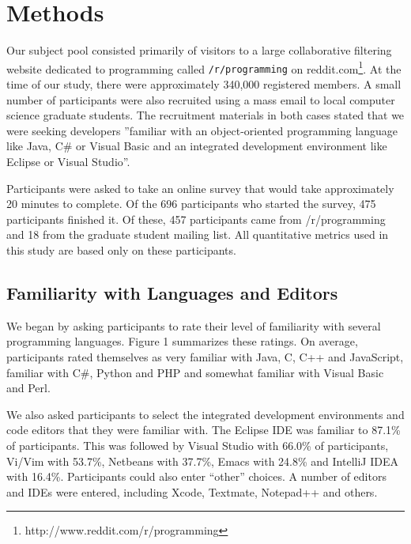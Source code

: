 \documentclass[conference]{IEEEtran}
\begin{document}

\section{Methods}
Our subject pool consisted primarily of visitors to a large collaborative filtering website dedicated to programming called {\tt /r/programming} on reddit.com\footnote{http://www.reddit.com/r/programming}. At the time of our study, there were approximately 340,000 registered members. A small number of participants were also recruited using a mass email to local computer science graduate students. The recruitment materials in both cases stated that we were seeking developers ''familiar with an object-oriented programming language like Java, C\# or Visual Basic and an integrated development environment like Eclipse or Visual Studio''.

Participants were asked to take an online survey that would take approximately 20 minutes to complete. Of the 696 participants who started the survey, 475 participants finished it. Of these, 457 participants came from /r/programming and 18 from the graduate student mailing list. All quantitative metrics used in this study are based only on these participants.

\subsection{Familiarity with Languages and Editors}

We began by asking participants to rate their level of familiarity with several programming languages. Figure 1 summarizes these ratings. On average, participants rated themselves as very familiar with Java, C, C++ and JavaScript, familiar with C\#, Python and PHP and somewhat familiar with Visual Basic and Perl.

We also asked participants to select the integrated development environments and code editors that they were familiar with. The Eclipse IDE was familiar to 87.1\% of participants. This was followed by Visual Studio with 66.0\% of participants, Vi/Vim with 53.7\%, Netbeans with 37.7\%, Emacs with 24.8\% and IntelliJ IDEA with 16.4\%. Participants could also enter ``other'' choices. A number of editors and IDEs were entered, including Xcode, Textmate, Notepad++ and others.
\end{document}
